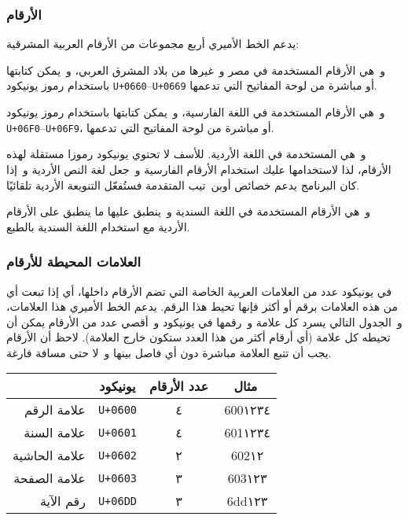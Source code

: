 \documentclass[a4paper]{article}
\newcommand\addff[1]{\addfontfeature{RawFeature={#1}}} %
\newcommand\addfl[1]{\addff{language=#1}}              %
\renewcommand\U[1]{\colorbox{codecolor}{\texttt{U+#1}}}
\begin{document}
\subsubsection{الأرقام}
يدعم الخط الأميري أربع مجموعات من الأرقام العربية المشرقية:

\begin{description}[style=nextline,font=\mdseries\addff{-pnum}]
\item[\addfl{ARA}٠١٢٣٤٥٦٧٨٩]
	و هي الأرقام المستخدمة في مصر و غيرها من بلاد المشرق العربي، و يمكن
	كتابتها باستخدام رموز يونيكود \U{0660}–\U{0669} أو
	مباشرة من لوحة المفاتيح التي تدعمها.

\item[\addfl{FAR}۰۱۲۳۴۵۶۷۸۹]
	و هي الأرقام المستخدمة في اللغة الفارسية، و يمكن كتابتها باستخدام
	رموز يونيكود \U{06F0}–\U{06F9}، أو مباشرة من لوحة
	المفاتيح التي تدعمها.

\item[\addfl{URD}۰۱۲۳۴۵۶۷۸۹]
	و هي المستخدمة في اللغة الأردية. للأسف لا تحتوي يونيكود رموزا مستقلة
	لهذه الأرقام، لذا لاستخدامها عليك استخدام الأرقام الفارسية و جعل لغة
	النص الأردية و إذا كان البرنامج يدعم خصائص أوبن تيب المتقدمة فستُفعّل
	التنويعة الأردية تلقائيًا.

\item[\addfl{SND}۰۱۲۳۴۵۶۷۸۹]
	و هي الأرقام المستخدمة في اللغة السندية و ينطبق عليها ما ينطبق على
	الأرقام الأردية مع استخدام اللغة السندية بالطبع.
\end{description}

\subsubsection{العلامات المحيطة للأرقام}
في يونيكود عدد من العلامات العربية الخاصة التي تضم الأرقام داخلها، أي
إذا تبعت أي من هذه العلامات برقم أو أكثر فإنها تحيط هذا الرقم. يدعم الخط
الأميري هذا العلامات، و الجدول التالي يسرد كل علامة و رقمها في يونيكود
و أقصي عدد من الأرقام يمكن أن تحيطه كل علامة (أي أرقام أكثر من هذا العدد
ستكون خارج العلامة). لاحظ أن الأرقام يجب أن تتبع العلامة مباشرة دون أي
فاصل بينها و لا حتى مسافة فارغة.

\begin{center}
  \begin{tabular}{r c c c}
    \hline
                  & يونيكود & عدد الأرقام & مثال     \\
    \hline
    علامة الرقم   & \U{0600} & ٤ & ^^^600١٢٣٤ \\
    علامة السنة   & \U{0601} & ٤ & ^^^601١٢٣٤ \\
    علامة الحاشية & \U{0602} & ٢ & ^^^602١٢   \\
    علامة الصفحة  & \U{0603} & ٣ & ^^^603١٢٣  \\
    رقم الآية     & \U{06DD} & ٣ & ^^^6dd١٢٣  \\
    \hline
  \end{tabular}
\end{center}
\end{document}
